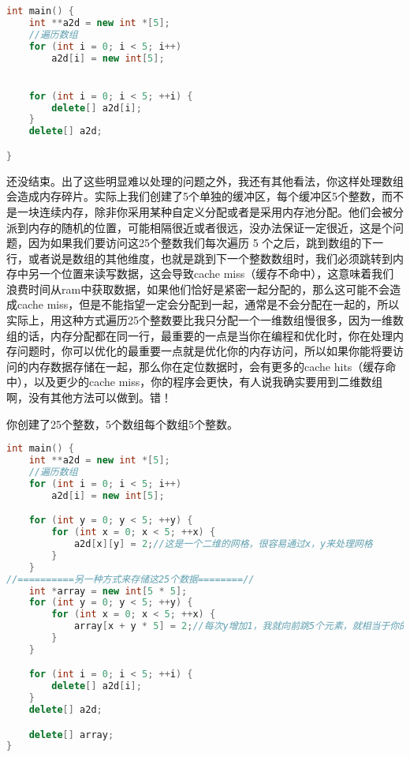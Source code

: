 \begin{lstlisting}[language=c++]
int main() {
    int **a2d = new int *[5];
    //遍历数组
    for (int i = 0; i < 5; i++)
        a2d[i] = new int[5];


    for (int i = 0; i < 5; ++i) {
        delete[] a2d[i];
    }
    delete[] a2d;

}
\end{lstlisting}

还没结束。出了这些明显难以处理的问题之外，我还有其他看法，你这样处理数组会造成内存碎片。实际上我们创建了5个单独的缓冲区，每个缓冲区5个整数，而不是一块连续内存，除非你采用某种自定义分配或者是采用内存池分配。他们会被分派到内存的随机的位置，可能相隔很近或者很远，没办法保证一定很近，这是个问题，因为如果我们要访问这25个整数我们每次遍历 5 个之后，跳到数组的下一行，或者说是数组的其他维度，也就是跳到下一个整数数组时，我们必须跳转到内存中另一个位置来读写数据，这会导致{\ncodestyle cache miss}（缓存不命中），这意味着我们浪费时间从ram中获取数据，如果他们恰好是紧密一起分配的，那么这可能不会造成cache miss，但是不能指望一定会分配到一起，通常是不会分配在一起的，所以实际上，用这种方式遍历25个整数要比我只分配一个一维数组慢很多，因为一维数组的话，内存分配都在同一行，最重要的一点是当你在编程和优化时，你在处理内存问题时，你可以优化的最重要一点就是优化你的内存访问，所以如果你能将要访问的内存数据存储在一起，那么你在定位数据时，会有更多的{\ncodestyle cache hits}（缓存命中），以及更少的{\ncodestyle cache miss}，你的程序会更快，有人说我确实要用到二维数组啊，没有其他方法可以做到。错！

你创建了25个整数，5个数组每个数组5个整数。

\begin{lstlisting}[language=c++]
int main() {
    int **a2d = new int *[5];
    //遍历数组
    for (int i = 0; i < 5; i++)
        a2d[i] = new int[5];

    for (int y = 0; y < 5; ++y) {
        for (int x = 0; x < 5; ++x) {
            a2d[x][y] = 2;//这是一个二维的网格，很容易通过x，y来处理网格
        }
    }
//==========另一种方式来存储这25个数据========//
    int *array = new int[5 * 5];
    for (int y = 0; y < 5; ++y) {
        for (int x = 0; x < 5; ++x) {
            array[x + y * 5] = 2;//每次y增加1，我就向前跳5个元素，就相当于你的数组网格向下跳一行
        }
    }

    for (int i = 0; i < 5; ++i) {
        delete[] a2d[i];
    }
    delete[] a2d;

    delete[] array;
}
\end{lstlisting}

